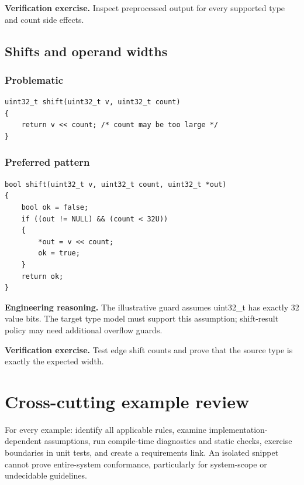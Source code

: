 \documentclass[10pt,letterpaper]{article}
\begin{document}
\textbf{Verification exercise.} Inspect preprocessed output for every supported type and count side effects.

\subsection{Shifts and operand widths}
\subsubsection*{Problematic}
\begin{lstlisting}[style=engineerc]
uint32_t shift(uint32_t v, uint32_t count)
{
    return v << count; /* count may be too large */
}
\end{lstlisting}
\subsubsection*{Preferred pattern}
\begin{lstlisting}[style=engineerc]
bool shift(uint32_t v, uint32_t count, uint32_t *out)
{
    bool ok = false;
    if ((out != NULL) && (count < 32U))
    {
        *out = v << count;
        ok = true;
    }
    return ok;
}
\end{lstlisting}
\textbf{Engineering reasoning.} The illustrative guard assumes uint32\_t has exactly 32 value bits. The target type model must support this assumption; shift-result policy may need additional overflow guards.

\textbf{Verification exercise.} Test edge shift counts and prove that the source type is exactly the expected width.


\section{Cross-cutting example review}
For every example: identify all applicable rules, examine implementation-dependent assumptions, run compile-time diagnostics and static checks, exercise boundaries in unit tests, and create a requirements link. An isolated snippet cannot prove entire-system conformance, particularly for system-scope or undecidable guidelines.
\end{document}
